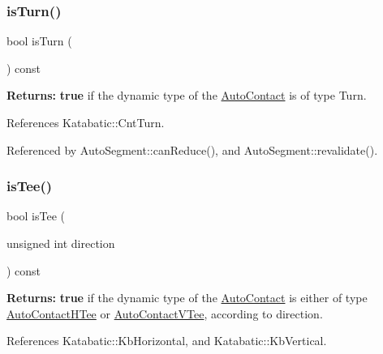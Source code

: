 \mbox{\label{classKatabatic_1_1AutoContact_a249530ac086dbf92f981887cc633facf}} 
\subsubsection{\texorpdfstring{is\+Turn()}{isTurn()}}
{\footnotesize\ttfamily bool is\+Turn (\begin{DoxyParamCaption}{ }\end{DoxyParamCaption}) const\hspace{0.3cm}{\ttfamily [inline]}}

{\bfseries Returns\+:} {\bfseries true} if the dynamic type of the \mbox{\hyperlink{classKatabatic_1_1AutoContact}{Auto\+Contact}} is of type Turn. 

References Katabatic\+::\+Cnt\+Turn.



Referenced by Auto\+Segment\+::can\+Reduce(), and Auto\+Segment\+::revalidate().

\mbox{\label{classKatabatic_1_1AutoContact_ae4ba7bc2888f990818cbdb808260c47e}} 
\subsubsection{\texorpdfstring{is\+Tee()}{isTee()}}
{\footnotesize\ttfamily bool is\+Tee (\begin{DoxyParamCaption}\item[{unsigned int}]{direction }\end{DoxyParamCaption}) const}

{\bfseries Returns\+:} {\bfseries true} if the dynamic type of the \mbox{\hyperlink{classKatabatic_1_1AutoContact}{Auto\+Contact}} is either of type \mbox{\hyperlink{classKatabatic_1_1AutoContactHTee}{Auto\+Contact\+H\+Tee}} or \mbox{\hyperlink{classKatabatic_1_1AutoContactVTee}{Auto\+Contact\+V\+Tee}}, according to {\ttfamily direction}. 

References Katabatic\+::\+Kb\+Horizontal, and Katabatic\+::\+Kb\+Vertical.

\mbox{\label{classKatabatic_1_1AutoContact_aeb66931d535cbd3d0f9bc525968e15f5}} 
